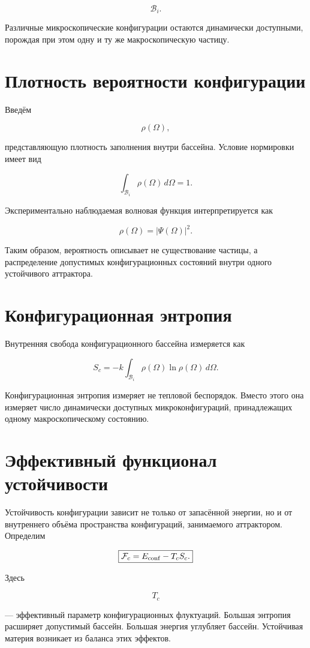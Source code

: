 \[ \mathcal B_i. \]

Различные микроскопические конфигурации остаются динамически доступными, порождая при этом одну и ту же макроскопическую частицу.

\section{Плотность вероятности конфигурации}

Введём

\[ \rho(\Omega), \]

представляющую плотность заполнения внутри бассейна. Условие нормировки имеет вид

\[ \int_{\mathcal B_i} \rho(\Omega)\,d\Omega=1. \]

Экспериментально наблюдаемая волновая функция интерпретируется как

\[ \boxed{ \rho(\Omega)=|\Psi(\Omega)|^2. } \]

Таким образом, вероятность описывает не существование частицы, а распределение допустимых конфигурационных состояний внутри одного устойчивого аттрактора.

\section{Конфигурационная энтропия}

Внутренняя свобода конфигурационного бассейна измеряется как

\[ \boxed{ S_c = -k \int_{\mathcal B_i} \rho(\Omega) \ln\rho(\Omega) \,d\Omega. } \]

Конфигурационная энтропия измеряет не тепловой беспорядок. Вместо этого она измеряет число динамически доступных микроконфигураций, принадлежащих одному макроскопическому состоянию.

\section{Эффективный функционал устойчивости}

Устойчивость конфигурации зависит не только от запасённой энергии, но и от внутреннего объёма пространства конфигураций, занимаемого аттрактором. Определим

\[ \boxed{ \mathcal F_c = E_{\rm conf} - T_cS_c. } \]

Здесь

\[ T_c \]

— эффективный параметр конфигурационных флуктуаций. Большая энтропия расширяет допустимый бассейн. Большая энергия углубляет бассейн. Устойчивая материя возникает из баланса этих эффектов.

